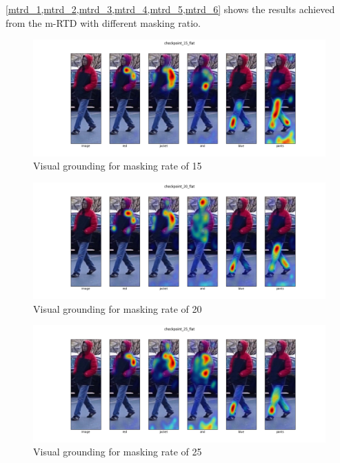 \ref{mtrd_1,mtrd_2,mtrd_3,mtrd_4,mtrd_5,mtrd_6} shows the results achieved from the m-RTD with different masking ratio.
\begin{figure}[htbp]
  \includegraphics[width=\linewidth]{img/mrtd_masking_ratio/mrtd-checkpoint_15_flat.png}
  \caption{Visual grounding for masking rate of 15}
  \label{mtrd_1}
\end{figure}

\begin{figure}[htbp]
  \includegraphics[width=\linewidth]{img/mrtd_masking_ratio/mrtd-checkpoint_20_flat.png}
  \caption{Visual grounding for masking rate of 20}
  \label{mtrd_2}
\end{figure}

\begin{figure}[htbp]
  \includegraphics[width=\linewidth]{img/mrtd_masking_ratio/mrtd-checkpoint_25_flat.png}
  \caption{Visual grounding for masking rate of 25} 
  \label{mtrd_3} 
\end{figure}

